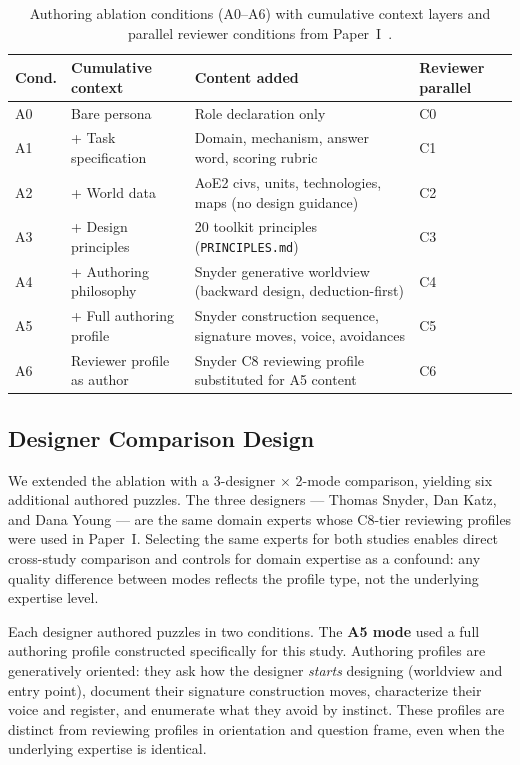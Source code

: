 \begin{table}[h]
\centering
\caption{Authoring ablation conditions (A0--A6) with cumulative context layers and parallel reviewer conditions from Paper~I~\protect\cite{paper1}.}
\label{tab:conditions}
\begin{tabular}{llp{5.2cm}l}
\toprule
\textbf{Cond.} & \textbf{Cumulative context} & \textbf{Content added} & \textbf{Reviewer parallel} \\
\midrule
A0 & Bare persona & Role declaration only & C0 \\
A1 & + Task specification & Domain, mechanism, answer word, scoring rubric & C1 \\
A2 & + World data & AoE2 civs, units, technologies, maps (no design guidance) & C2 \\
A3 & + Design principles & 20 toolkit principles (\texttt{PRINCIPLES.md}) & C3 \\
A4 & + Authoring philosophy & Snyder generative worldview (backward design, deduction-first) & C4 \\
A5 & + Full authoring profile & Snyder construction sequence, signature moves, voice, avoidances & C5 \\
A6 & Reviewer profile as author & Snyder C8 reviewing profile substituted for A5 content & C6 \\
\bottomrule
\end{tabular}
\end{table}

\subsection{Designer Comparison Design}
\label{sec:designer-comparison}

We extended the ablation with a 3-designer $\times$ 2-mode comparison, yielding six additional authored puzzles. The three designers --- Thomas Snyder, Dan Katz, and Dana Young --- are the same domain experts whose C8-tier reviewing profiles were used in Paper~I. Selecting the same experts for both studies enables direct cross-study comparison and controls for domain expertise as a confound: any quality difference between modes reflects the profile type, not the underlying expertise level.

Each designer authored puzzles in two conditions. The \textbf{A5 mode} used a full authoring profile constructed specifically for this study. Authoring profiles are generatively oriented: they ask how the designer \emph{starts} designing (worldview and entry point), document their signature construction moves, characterize their voice and register, and enumerate what they avoid by instinct. These profiles are distinct from reviewing profiles in orientation and question frame, even when the underlying expertise is identical.

